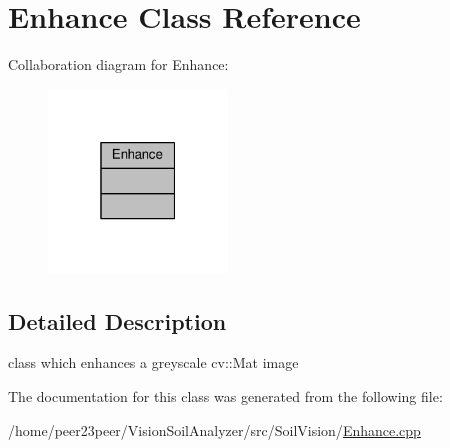 \hypertarget{class_enhance}{}\section{Enhance Class Reference}
\label{class_enhance}


Collaboration diagram for Enhance\+:\nopagebreak
\begin{figure}[H]
\begin{center}
\leavevmode
\includegraphics[width=135pt]{class_enhance__coll__graph}
\end{center}
\end{figure}


\subsection{Detailed Description}
class which enhances a greyscale cv\+::\+Mat image 

The documentation for this class was generated from the following file\+:\begin{DoxyCompactItemize}
\item 
/home/peer23peer/\+Vision\+Soil\+Analyzer/src/\+Soil\+Vision/\hyperlink{_enhance_8cpp}{Enhance.\+cpp}\end{DoxyCompactItemize}
